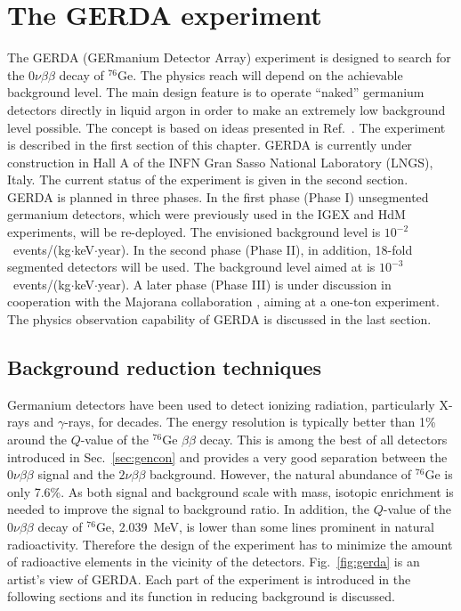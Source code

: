 \chapter{The GERDA experiment}
\label{cha:gerda}
The GERDA (GERmanium Detector Array) experiment \cite{Abt04, Sch05} is
designed to search for the $0\nu\beta\beta$ decay of $^{76}$Ge. The
physics reach will depend on the achievable background level. The main
design feature is to operate ``naked'' germanium detectors directly in
liquid argon in order to make an extremely low background level
possible. The concept is based on ideas presented in
Ref.~\cite{Heu95}. The experiment is described in the first section of
this chapter. GERDA is currently under construction in Hall A of the
INFN Gran Sasso National Laboratory (LNGS), Italy. The current status
of the experiment is given in the second section. GERDA is planned in
three phases. In the first phase (Phase I) unsegmented germanium
detectors, which were previously used in the IGEX \cite{Aal02} and HdM
\cite{Hei04} experiments, will be re-deployed. The envisioned
background level is $10^{-2}$~events/(kg$\cdot$keV$\cdot$year). In the
second phase (Phase II), in addition, 18-fold segmented detectors will
be used. The background level aimed at is
$10^{-3}$~events/(kg$\cdot$keV$\cdot$year). A later phase (Phase III)
is under discussion in cooperation with the Majorana collaboration
\cite{Gai03, Aal04}, aiming at a one-ton experiment. The physics
observation capability of GERDA is discussed in the last section.

\section{Background reduction techniques}
\label{sec:gerda:conc}
Germanium detectors have been used to detect ionizing radiation,
particularly X-rays and $\gamma$-rays, for decades. The energy
resolution is typically better than 1\% around the $Q$-value of the
$^{76}$Ge $\beta\beta$ decay. This is among the best of all detectors
introduced in Sec.~\ref{sec:gencon} and provides a very good
separation between the $0\nu\beta\beta$ signal and the
$2\nu\beta\beta$ background. However, the natural abundance of
$^{76}$Ge is only 7.6\%. As both signal and background scale with
mass, isotopic enrichment is needed to improve the signal to
background ratio. In addition, the $Q$-value of the $0\nu\beta\beta$
decay of $^{76}$Ge, 2.039~MeV, is lower than some lines prominent in
natural radioactivity. Therefore the design of the experiment has to
minimize the amount of radioactive elements in the vicinity of the
detectors. Fig.~\ref{fig:gerda} is an artist's view of GERDA. Each
part of the experiment is introduced in the following sections and its
function in reducing background is discussed.

